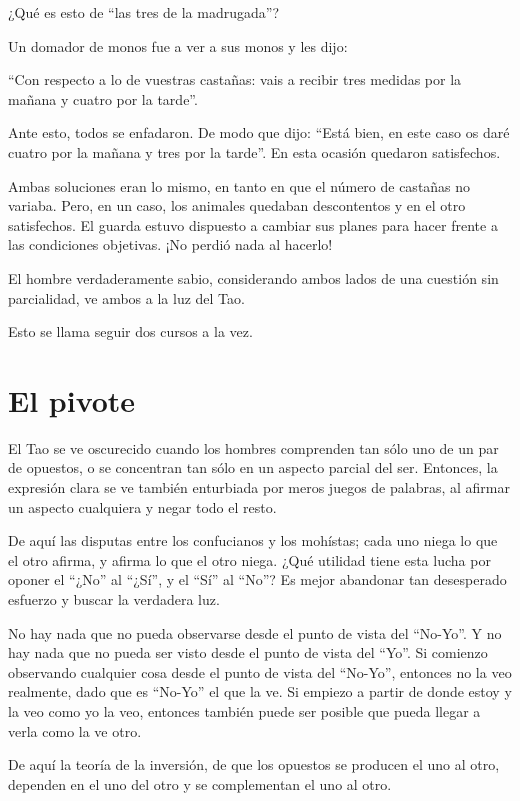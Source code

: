 \documentclass[book,b5paper,hidelinks,final]{memoir}
\begin{document}
	¿Qué es esto de ``las tres de la madrugada''?
	
	Un domador de monos fue a ver a sus monos y les dijo:
	
	``Con respecto a lo de vuestras castañas: vais a recibir tres medidas
	por la mañana y cuatro por la tarde''.
	
	Ante esto, todos se enfadaron. De modo que dijo: ``Está bien, en este
	caso os daré cuatro por la mañana y tres por la tarde''. En esta ocasión
	quedaron satisfechos.
	
	Ambas soluciones eran lo mismo, en tanto en que el número de castañas no
	variaba. Pero, en un caso, los animales quedaban descontentos y en el
	otro satisfechos. El guarda estuvo dispuesto a cambiar sus planes para
	hacer frente a las condiciones objetivas. ¡No perdió nada al hacerlo!
	
	El hombre verdaderamente sabio, considerando ambos lados de una cuestión
	sin parcialidad, ve ambos a la luz del Tao.
	
	Esto se llama seguir dos cursos a la vez.
	
	\chapter*{El pivote}
	
	El Tao se ve oscurecido cuando los hombres comprenden tan sólo uno de un
	par de opuestos, o se concentran tan sólo en un aspecto parcial del ser.
	Entonces, la expresión clara se ve también enturbiada por meros juegos
	de palabras, al afirmar un aspecto cualquiera y negar todo el resto.
	
	De aquí las disputas entre los confucianos y los mohístas; cada uno
	niega lo que el otro afirma, y afirma lo que el otro niega. ¿Qué
	utilidad tiene esta lucha por oponer el ``¿No'' al ``¿Sí'', y el ``Sí''
	al ``No''? Es mejor abandonar tan desesperado esfuerzo y buscar la
	verdadera luz.
	
	No hay nada que no pueda observarse desde el punto de vista del
	``No-Yo''. Y no hay nada que no pueda ser visto desde el punto de vista
	del ``Yo''. Si comienzo observando cualquier cosa desde el punto de
	vista del ``No-Yo'', entonces no la veo realmente, dado que es ``No-Yo''
	el que la ve. Si empiezo a partir de donde estoy y la veo como yo la
	veo, entonces también puede ser posible que pueda llegar a verla como la
	ve otro.
	
	De aquí la teoría de la inversión, de que los opuestos se producen el
	uno al otro, dependen en el uno del otro y se complementan el uno al
	otro.
	
\end{document}
